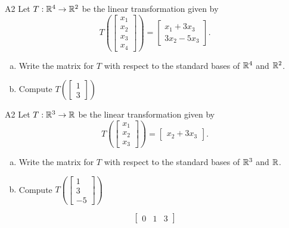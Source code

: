 \begin{problem}{A2}
Let $T: \mathbb{R}^4 \rightarrow \mathbb{R}^2$ be the linear transformation given by $$T\left(\begin{bmatrix} x_1 \\ x_2 \\ x_3 \\ x_4 \end{bmatrix} \right) = \begin{bmatrix} x_1+3x_3 \\ 3x_2-5x_3 \end{bmatrix}.$$ 
\begin{enumerate}[(a)]
\item Write the matrix for $T$ with respect to the standard bases of $\mathbb{R}^4$ and $\mathbb{R}^2$.
\item Compute \( T\left( \begin{bmatrix} 1 \\ 3 \end{bmatrix} \right) \)
\end{enumerate}
\end{problem}


\begin{problem}{A2}
Let $T: \mathbb{R}^3 \rightarrow \mathbb{R}$ be the linear transformation given by $$T\left(\begin{bmatrix} x_1 \\ x_2 \\ x_3  \end{bmatrix} \right) = \begin{bmatrix} x_2+3x_3 \end{bmatrix}.$$ 
\begin{enumerate}[(a)]
\item Write the matrix for $T$ with respect to the standard bases of $\mathbb{R}^3$ and $\mathbb{R}$.
\item Compute \( T\left( \begin{bmatrix} 1 \\ 3 \\ -5\end{bmatrix} \right) \)
\end{enumerate}
\end{problem}
\begin{solution}
$$\begin{bmatrix} 0 & 1 & 3 \end{bmatrix}$$
\end{solution}

